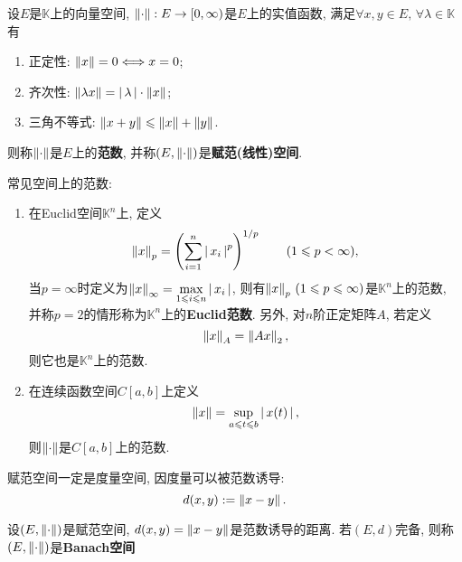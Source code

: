 	\begin{Def}[赋范空间]\label{def:赋范空间}
	设$ E $是$ \mathbb{K} $上的向量空间, $ \left\| \cdot \right\| : E\to[0,\infty) $是$ E $上的实值函数, 满足$ \forall x,y\in E,\,\forall\lambda\in\mathbb{K} $有
	
	\begin{enumerate}[(1)]
	\item 正定性: $ \left\| x \right\|=0\Longleftrightarrow x=0 $;
	
	\item 齐次性: $ \left\| \lambda x \right\|=\left| \,\lambda\, \right| \cdot\left\| x \right\| $;
	
	\item 三角不等式: $ \left\| x+y \right\|\leqslant\left\| x \right\|+\left\| y \right\| $.
	\end{enumerate} 
	则称$ \left\| \cdot \right\| $是$ E $上的\textbf{范数}, 并称$ (E,\left\| \cdot \right\|) $是\textbf{赋范(线性)空间}.
	\end{Def}
	
	\begin{Ex}
	常见空间上的范数:
	
	\begin{enumerate}[(1)]
	\item 在Euclid空间$ \mathbb{K}^n $上, 定义
		\[
		\left\| x \right\|_p=\left(\sum_{i=1}^n\left| \,x_i\, \right| ^p\right)^{1/p}\qquad(1\leqslant p<\infty),
		\]
		当$ p=\infty $时定义为$ \left\| x \right\|_\infty=\max\limits_{1\leqslant i\leqslant n}\left| \,x_i\, \right|  $, 则有$ \left\| x \right\|_p\,(1\leqslant p\leqslant\infty) $是$ \mathbb{K}^n $上的范数, 并称$ p=2 $的情形称为$ \mathbb{K}^n $上的\textbf{Euclid范数}. 另外, 对$ n $阶正定矩阵$ A $, 若定义
		\[
		\left\| x \right\|_A=\left\| Ax \right\|_2,
		\]
		则它也是$ \mathbb{K}^n $上的范数.
	
	\item 在连续函数空间$ C[a,b] $上定义
	\[
	\left\| x \right\|=\sup_{a\leqslant t\leqslant b}\left| \,x(t)\, \right| ,
	\]
	则$ \left\| \cdot \right\| $是$ C[a,b] $上的范数.
	\end{enumerate}
	
	\end{Ex}
	
	\begin{Rmk}
	赋范空间一定是度量空间, 因度量可以被范数诱导:
	\[
	d(x,y):=\left\| x-y \right\|.
	\]
	\end{Rmk}
	
	\begin{Def}[Banach空间]\label{def:Banach空间}
	设$ (E,\left\| \cdot \right\|) $是赋范空间, $ d(x,y)=\left\| x-y \right\| $是范数诱导的距离. 若$ (E,d) $完备, 则称$ (E,\left\| \cdot \right\|) $是\textbf{Banach空间}
	\end{Def}
	
